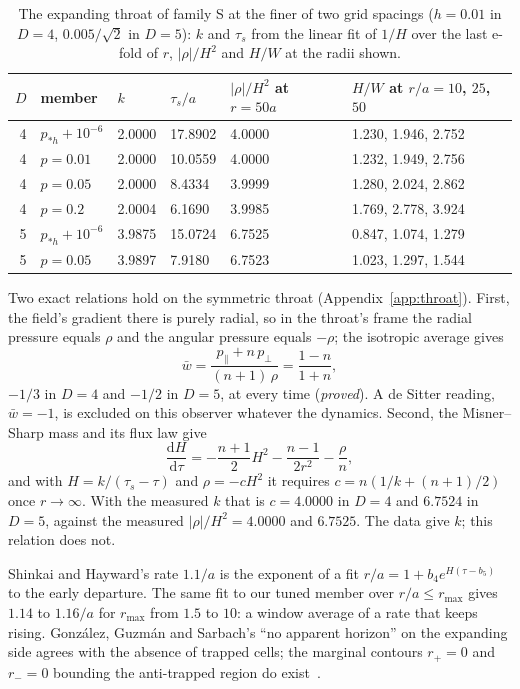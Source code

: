 \documentclass[11pt]{article}
\newcommand{\dd}{\mathrm{d}}
\newcommand{\pst}{p_{*h}}
\begin{document}
\begin{table}[tbp]
\centering
\caption{The expanding throat of family S at the finer of two grid spacings ($h=0.01$ in $D=4$, $0.005/\sqrt2$ in
$D=5$): $k$ and $\tau_s$ from the linear fit of $1/H$ over the last e-fold of $r$, $|\rho|/H^2$ and $H/W$ at the radii
shown.}
\label{tab:expand}
\small
\begin{tabular}{rlllll}
\toprule
$D$ & member & $k$ & $\tau_s/a$ & $|\rho|/H^2$ at $r=50a$ & $H/W$ at $r/a=10$, $25$, $50$ \\
\midrule
4 & $\pst+10^{-6}$ & 2.0000 & 17.8902 & 4.0000 & 1.230, 1.946, 2.752 \\
4 & $p=0.01$ & 2.0000 & 10.0559 & 4.0000 & 1.232, 1.949, 2.756 \\
4 & $p=0.05$ & 2.0000 & 8.4334 & 3.9999 & 1.280, 2.024, 2.862 \\
4 & $p=0.2$ & 2.0004 & 6.1690 & 3.9985 & 1.769, 2.778, 3.924 \\
5 & $\pst+10^{-6}$ & 3.9875 & 15.0724 & 6.7525 & 0.847, 1.074, 1.279 \\
5 & $p=0.05$ & 3.9897 & 7.9180 & 6.7523 & 1.023, 1.297, 1.544 \\
\bottomrule
\end{tabular}
\end{table}

Two exact relations hold on the symmetric throat (Appendix~\ref{app:throat}). First, the field's gradient there is
purely radial, so in the throat's frame the radial pressure equals $\rho$ and the angular pressure equals $-\rho$; the
isotropic average gives
\begin{equation}
\bar w=\frac{p_\parallel+n\,p_\perp}{(n+1)\,\rho}=\frac{1-n}{1+n},\label{eq:wbar}
\end{equation}
$-1/3$ in $D=4$ and $-1/2$ in $D=5$, at every time (\emph{proved}). A de Sitter reading, $\bar w=-1$, is excluded on
this observer whatever the dynamics. Second, the Misner--Sharp mass and its flux law give
\begin{equation}
\frac{\dd H}{\dd\tau}=-\frac{n+1}{2}H^2-\frac{n-1}{2r^2}-\frac{\rho}{n},\label{eq:hdot}
\end{equation}
and with $H=k/(\tau_s-\tau)$ and $\rho=-cH^2$ it requires $c=n(1/k+(n+1)/2)$ once $r\to\infty$. With the measured $k$ that is
$c=4.0000$ in $D=4$ and $6.7524$ in $D=5$, against the measured $|\rho|/H^2=4.0000$ and $6.7525$. The data give $k$;
this relation does not.

Shinkai and Hayward's rate $1.1/a$ is the exponent of a fit $r/a=1+b_4e^{H(\tau-b_5)}$ to the early departure. The same
fit to our tuned member over $r/a\le r_{\max}$ gives $1.14$ to $1.16/a$ for $r_{\max}$ from $1.5$ to $10$: a window
average of a rate that keeps rising. Gonz\'alez, Guzm\'an and Sarbach's ``no apparent horizon'' on the expanding side
agrees with the absence of trapped cells; the marginal contours $r_+=0$ and $r_-=0$ bounding the anti-trapped region do
exist~\cite{GGS2009b}.
\end{document}
